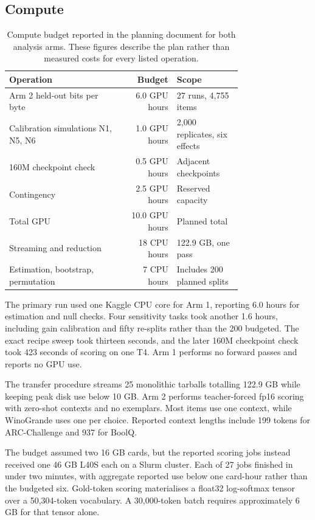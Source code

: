 \subsection{Compute}
\begin{table}[!htb]
\centering
\caption{Compute budget reported in the planning document for both analysis arms. These figures describe the plan rather than measured costs for every listed operation.}
\label{tab:original15}
\small\setlength{\tabcolsep}{4pt}\renewcommand{\arraystretch}{1.12}
\begin{tabular}{L{0.48\linewidth}rL{0.28\linewidth}}\toprule
Operation & Budget & Scope\\\midrule
Arm 2 held-out bits per byte & 6.0 GPU hours & 27 runs, 4,755 items\\
Calibration simulations N1, N5, N6 & 1.0 GPU hours & 2,000 replicates, six effects\\
160M checkpoint check & 0.5 GPU hours & Adjacent checkpoints\\
Contingency & 2.5 GPU hours & Reserved capacity\\
Total GPU & 10.0 GPU hours & Planned total\\
Streaming and reduction & 18 CPU hours & 122.9 GB, one pass\\
Estimation, bootstrap, permutation & 7 CPU hours & Includes 200 planned splits\\\bottomrule
\end{tabular}
\end{table}

The primary run used one Kaggle CPU core for Arm 1, reporting 6.0 hours for estimation and null checks. Four sensitivity tasks took another 1.6 hours, including gain calibration and fifty re-splits rather than the 200 budgeted. The exact recipe sweep took thirteen seconds, and the later 160M checkpoint check took 423 seconds of scoring on one T4. Arm 1 performs no forward passes and reports no GPU use.

The transfer procedure streams 25 monolithic tarballs totalling 122.9 GB while keeping peak disk use below 10 GB. Arm 2 performs teacher-forced fp16 scoring with zero-shot contexts and no exemplars. Most items use one context, while WinoGrande uses one per choice. Reported context lengths include 199 tokens for ARC-Challenge and 937 for BoolQ.

The budget assumed two 16 GB cards, but the reported scoring jobs instead received one 46 GB L40S each on a Slurm cluster. Each of 27 jobs finished in under two minutes, with aggregate reported use below one card-hour rather than the budgeted six. Gold-token scoring materialises a float32 log-softmax tensor over a 50,304-token vocabulary. A 30,000-token batch requires approximately 6 GB for that tensor alone.

